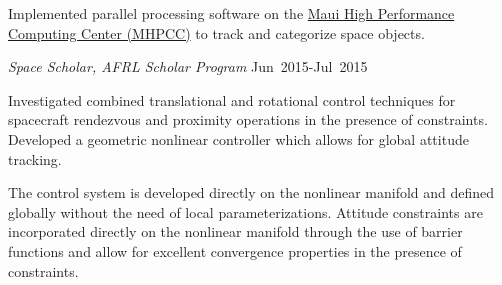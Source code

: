 \documentclass[10pt]{article}
\newcommand{\blankline}{\quad\pagebreak[3]}
\begin{document}
\begin{lonelist}
\begin{innerlist}
            Implemented parallel processing software on the \href{https://www.mhpcc.hpc.mil/}{Maui High Performance Computing Center (MHPCC)} to track and categorize space objects.
        \end{innerlist}
		\item[] \textit{Space Scholar, AFRL Scholar Program} \hfill {Jun~2015-Jul~2015}
		\begin{innerlist}
			\item Investigated combined translational and rotational control techniques for spacecraft rendezvous and proximity operations in the presence of constraints.
			Developed a geometric nonlinear controller which allows for global attitude tracking.
			\item The control system is developed directly on the nonlinear manifold and defined globally without the need of local parameterizations.
			Attitude constraints are incorporated directly on the nonlinear manifold through the use of barrier functions and allow for excellent convergence properties in the presence of constraints. 
		\end{innerlist}
	\end{lonelist}
	
\blankline
\end{document}
